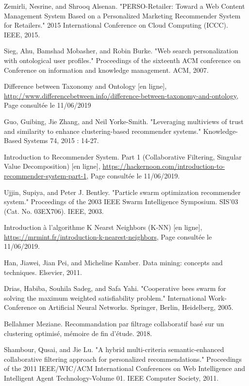 \begin{thebibliography}{100}
 Zemirli, Nesrine, and Shrooq Alsenan. "PERSO-Retailer: Toward a Web Content Management System Based on a Personalized Marketing Recommender System for Retailers." 2015 International Conference on Cloud Computing (ICCC). IEEE, 2015.


 Sieg, Ahu, Bamshad Mobasher, and Robin Burke. "Web search personalization with ontological user profiles." Proceedings of the sixteenth ACM conference on Conference on information and knowledge management. ACM, 2007.

Difference between Taxonomy and Ontology [en ligne], \url{http://www.differencebetween.info/difference-between-taxonomy-and-ontology}, Page consultée le 11/06/2019


 Guo, Guibing, Jie Zhang, and Neil Yorke-Smith. "Leveraging multiviews of trust and similarity to enhance clustering-based recommender systems." Knowledge-Based Systems 74, 2015 : 14-27.

Introduction to Recommender System. Part 1 (Collaborative Filtering, Singular Value Decomposition) [en ligne], \url{https://hackernoon.com/introduction-to-recommender-system-part-1}, Page consultée le 11/06/2019.

 Ujjin, Supiya, and Peter J. Bentley. "Particle swarm optimization recommender system." Proceedings of the 2003 IEEE Swarm Intelligence Symposium. SIS'03 (Cat. No. 03EX706). IEEE, 2003.

Introduction à l’algorithme K Nearst Neighbors (K-NN) [en ligne], \url{https://mrmint.fr/introduction-k-nearest-neighbors},  Page consultée le 11/06/2019.

 Han, Jiawei, Jian Pei, and Micheline Kamber. Data mining: concepts and techniques. Elsevier, 2011.


Drias, Habiba, Souhila Sadeg, and Safa Yahi. "Cooperative bees swarm for solving the maximum weighted satisfiability problem." International Work-Conference on Artificial Neural Networks. Springer, Berlin, Heidelberg, 2005.

 Bellahmer Meziane. Recommandation par filtrage collaboratif basé sur un clustering optimisé, mémoire de fin d'étude. 2018.


 Shambour, Qusai, and Jie Lu. "A hybrid multi-criteria semantic-enhanced collaborative filtering approach for personalized recommendations." Proceedings of the 2011 IEEE/WIC/ACM International Conferences on Web Intelligence and Intelligent Agent Technology-Volume 01. IEEE Computer Society, 2011.


\end{thebibliography}
